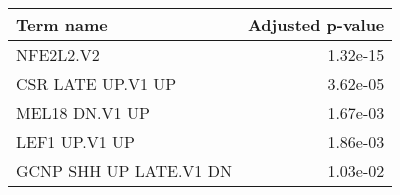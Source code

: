\begin{tabular}{lr}
\toprule
             Term name &  Adjusted p-value \\
\midrule
             NFE2L2.V2 &          1.32e-15 \\
     CSR LATE UP.V1 UP &          3.62e-05 \\
        MEL18 DN.V1 UP &          1.67e-03 \\
         LEF1 UP.V1 UP &          1.86e-03 \\
GCNP SHH UP LATE.V1 DN &          1.03e-02 \\
\bottomrule
\end{tabular}
